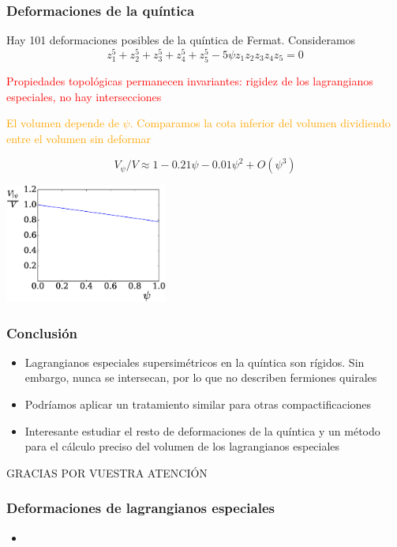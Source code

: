 \documentclass{beamer}
\begin{document}
\begin{frame}
  \frametitle{Deformaciones de la quíntica}
  \begin{itemize}
    \item Hay 101 deformaciones posibles de la quíntica de Fermat. 
      Consideramos
      \begin{equation*}
        z_1^5+z_2^5+z_3^5+z_4^5+z_5^5-5\psi z_1z_2z_3z_4z_5=0 
      \end{equation*}
      \textcolor{red}{
    \item Propiedades topológicas permanecen invariantes: rigidez de los lagrangianos especiales, no hay intersecciones}
    \textcolor{orange}{
    \item El volumen depende de $\psi$. Comparamos la cota inferior del volumen dividiendo entre el volumen sin deformar}
      \begin{equation*}
        V_\psi/V \approx 1 - 0.21\psi -0.01\psi^2+O(\psi^3)
      \end{equation*}
      \begin{center}
      \includegraphics[width=0.4\textwidth]{graph.eps}
      \end{center}
  \end{itemize}
\end{frame}

\begin{frame}
  \frametitle{Conclusión}
  \begin{itemize}
    \item Lagrangianos especiales supersimétricos en la quíntica son rígidos.
      Sin embargo, nunca se intersecan, por lo que no describen fermiones quirales
    \item  Podríamos aplicar un tratamiento similar para otras compactificaciones
    \item Interesante estudiar el resto de deformaciones de la quíntica y un método para el cálculo preciso 
      del volumen de los lagrangianos especiales
  \end{itemize}
\end{frame}

\begin{frame}
  \begin{center}
  \Large{GRACIAS POR VUESTRA ATENCIÓN}
  \end{center}
\end{frame}

\begin{frame}
  \frametitle{Deformaciones de lagrangianos especiales}
  \begin{itemize}
    \item 
  \end{itemize}
\end{frame}
\end{document}
